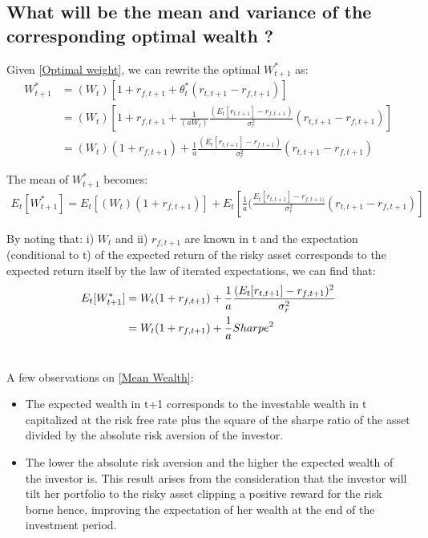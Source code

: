 \documentclass[12pt]{article}
\begin{document}
	\subsection{What will be the mean and variance of the corresponding optimal wealth ?} \label{Optimal Wealth}
	
	Given \ref{Optimal weight}, we can rewrite the optimal $W_{t+1}^{*}$ as: \vspace{-2.5em}\\
	
	\begin{align*}
		W_{t+1}^{*} &= (W_t) \left[1 + r_{f,t+1} + \theta_t^*(r_{t,t+1}-r_{f, t+1}) \right]\\
		&= (W_t) \left[1 + r_{f,t+1} + \frac{1}{(aW_t)}\frac{(E_{t}[r_{t,t+1}]-r_{f, t+1})}{\sigma_r^2}(r_{t,t+1}-r_{f, t+1}) \right]\\
		&= (W_t)(1 + r_{f,t+1}) + \frac{1}{a}\frac{(E_{t}[r_{t,t+1}]-r_{f, t+1})}{\sigma_r^2}(r_{t,t+1}-r_{f, t+1})
	\end{align*} \vspace{-1.35em}
	
	The mean of $W_{t+1}^{*}$ becomes:
	\begin{align*}
		E_{t}[W_{t+1}^{*}] = E_{t}[(W_t)(1 + r_{f,t+1})] + E_{t}[\frac{1}{a}(\frac{E_{t}[r_{t,t+1}]-r_{f, t+1)}}{\sigma_r^2}(r_{t,t+1}-r_{f, t+1})]
	\end{align*} \vspace{-1.25em}
	
	By noting that: i) $W_t$ and ii) $r_{f,t+1}$ are known in t and the expectation (conditional to t) of the expected return of the risky asset corresponds to the expected return itself by the law of iterated expectations, we can find that:    
	\begin{align} \label{Mean Wealth}
		E_{t}[W_{t+1}^{*}] &= W_t(1 + r_{f,t+1}) + \frac{1}{a}\frac{(E_{t}[r_{t,t+1}]-r_{f, t+1})^2}{\sigma_r^2} \notag\\
		&= W_t(1 + r_{f,t+1}) + \frac{1}{a}Sharpe^2 \\ \notag
	\end{align} \vspace{-3.25em}  
	
	A few observations on \ref{Mean Wealth}:
	\begin{itemize}
		\item The expected wealth in t+1 corresponds to the investable wealth in t capitalized at the risk free rate plus the square of the sharpe ratio of the asset divided by the absolute risk aversion of the investor.
		\item The lower the absolute risk aversion and the higher the expected wealth of the investor is. This result arises from the consideration that the investor will tilt her portfolio to the risky asset clipping a positive reward for the risk borne hence, improving the expectation of her wealth at the end of the investment period.       
	\end{itemize}
	
\end{document}
